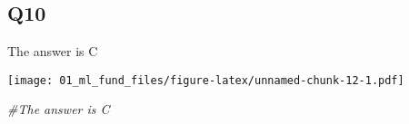 \documentclass[
]{article}
\newenvironment{Shaded}{\begin{snugshade}}{\end{snugshade}}
\newcommand{\CommentTok}[1]{\textcolor[rgb]{0.56,0.35,0.01}{\textit{#1}}}
\newcommand{\KeywordTok}[1]{\textcolor[rgb]{0.13,0.29,0.53}{\textbf{#1}}}
\newcommand{\NormalTok}[1]{#1}
\newcommand{\OperatorTok}[1]{\textcolor[rgb]{0.81,0.36,0.00}{\textbf{#1}}}
\newcommand{\StringTok}[1]{\textcolor[rgb]{0.31,0.60,0.02}{#1}}
\begin{document}
\hypertarget{q10}{%
\subsection{Q10}\label{q10}}

The answer is C

\begin{Shaded}
\end{Shaded}

\texttt{[image: 01\_ml\_fund\_files/figure-latex/unnamed-chunk-12-1.pdf]}

\begin{Shaded}
\begin{Highlighting}[]
\CommentTok{#The answer is C}
\end{Highlighting}
\end{Shaded}
\end{document}
